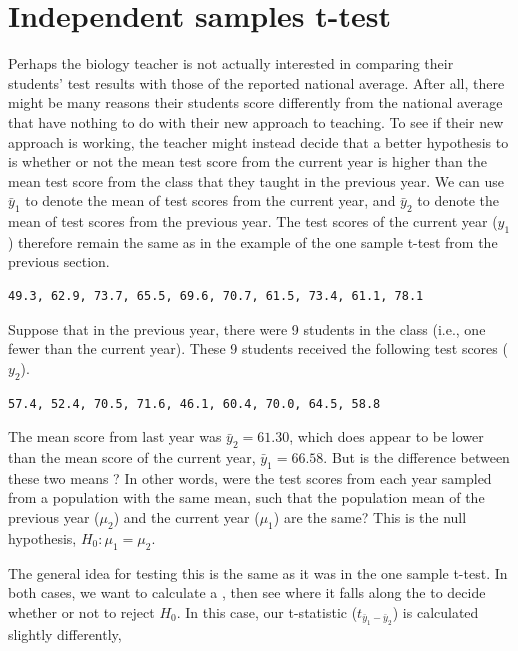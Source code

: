 \documentclass[
  openany]{krantz}
\begin{document}
\hypertarget{independent-samples-t-test}{%
\section{Independent samples t-test}\label{independent-samples-t-test}}

Perhaps the biology teacher is not actually interested in comparing their students' test results with those of the reported national average.
After all, there might be many reasons their students score differently from the national average that have nothing to do with their new approach to teaching.
To see if their new approach is working, the teacher might instead decide that a better hypothesis to  is whether or not the mean test score from the current year is higher than the mean test score from the class that they taught in the previous year.
We can use \(\bar{y}_{1}\) to denote the mean of test scores from the current year, and \(\bar{y}_{2}\) to denote the mean of test scores from the previous year.
The test scores of the current year (\(y_{1}\)) therefore remain the same as in the example of the one sample t-test from the previous section.

\begin{verbatim}
49.3, 62.9, 73.7, 65.5, 69.6, 70.7, 61.5, 73.4, 61.1, 78.1
\end{verbatim}

Suppose that in the previous year, there were 9 students in the class (i.e., one fewer than the current year).
These 9 students received the following test scores (\(y_{2}\)).

\begin{verbatim}
57.4, 52.4, 70.5, 71.6, 46.1, 60.4, 70.0, 64.5, 58.8
\end{verbatim}

The mean score from last year was \(\bar{y}_{2} = 61.30\), which does appear to be lower than the mean score of the current year, \(\bar{y}_{1} = 66.58\).
But is the difference between these two means ?
In other words, were the test scores from each year sampled from a population with the same mean, such that the population mean of the previous year (\(\mu_{2}\)) and the current year (\(\mu_{1}\)) are the same?
This is the null hypothesis, \(H_{0}: \mu_{1} = \mu_{2}\).

The general idea for testing this  is the same as it was in the one sample t-test.
In both cases, we want to calculate a , then see where it falls along the  to decide whether or not to reject \(H_{0}\).
In this case, our t-statistic (\(t_{\bar{y}_{1} - \bar{y}_{2}}\)) is calculated slightly differently,
\end{document}
